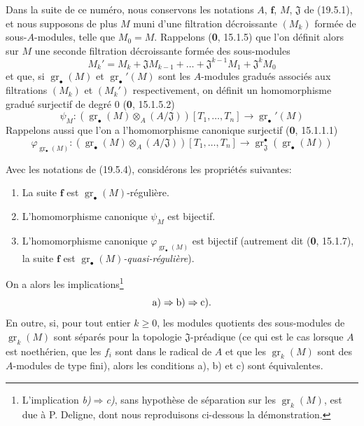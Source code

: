 \begin{env}[19.5.4]
\label{IV.19.5.4}
Dans la suite de ce numéro, nous conservons les notations $A$, $\mathbf f$, $M$, $\mathfrak J$ de (19.5.1), et nous supposons de plus $M$ muni d'une filtration décroissante $(M_k)$ formée de sous-$A$-modules, telle que $M_0=M$. Rappelons (\textbf{0}, 15.1.5) que l'on définit alors sur $M$ une seconde filtration décroissante formée des sous-modules
\[
  M_k'=M_k+\mathfrak JM_{k-1}+\ldots+\mathfrak J^{k-1}M_1+\mathfrak J^kM_0
\]
et que, si $\operatorname{gr}_\bullet(M)$ et $\operatorname{gr}_\bullet'(M)$ sont les $A$-modules gradués associés aux filtrations $(M_k)$ et $(M_k')$ respectivement, on définit un homomorphisme gradué surjectif de degré $0$ (\textbf{0}, 15.1.5.2)
\[
  \psi_M:(\operatorname{gr}_\bullet(M)\otimes_A(A/\mathfrak J))[T_1,\ldots,T_n]\longrightarrow\operatorname{gr}_\bullet'(M)
\]
Rappelons aussi que l'on a l'homomorphisme canonique surjectif (\textbf{0}, 15.1.1.1)
\[
  \varphi_{\operatorname{gr}_\bullet(M)}:(\operatorname{gr}_\bullet(M)\otimes_A(A/\mathfrak J))[T_1,\ldots,T_n]\longrightarrow\operatorname{gr}_{\mathfrak J}^\bullet(\operatorname{gr}_\bullet(M))
\]
\end{env}

\begin{theorem}[19.5.5]
\label{IV.19.5.5}
Avec les notations de \textup{(19.5.4)}, considérons les propriétés suivantes:
\begin{enumerate}
  \item[\textup{a)}] La suite $\mathbf f$ est $\operatorname{gr}_\bullet(M)$-régulière.
  \item[\textup{b)}] L'homomorphisme canonique $\psi_M$ est bijectif.
  \item[\textup{c)}] L'homomorphisme canonique $\varphi_{\operatorname{gr}_\bullet(M)}$ est bijectif \textup{(autrement dit (\textbf{0}, 15.1.7), la suite $\mathbf f$ est $\operatorname{gr}_\bullet(M)$\emph{-quasi-régulière})}.
\end{enumerate}


On a alors les implications\footnote{L'implication \emph{b)}$\Rightarrow$\emph{c)}, sans hypothèse de séparation sur les $\operatorname{gr}_k(M)$, est due à P. Deligne, dont nous reproduisons ci-dessous la démonstration.}
\[
  \textup{a)}\Rightarrow\textup{b)}\Rightarrow\textup{c)}.
\]
En outre, si, pour tout entier $k\geq0$, les modules quotients des sous-modules de $\operatorname{gr}_k(M)$ sont séparés pour la topologie $\mathfrak J$-préadique \textup{(ce qui est le cas lorsque $A$ est noethérien, que les $f_i$ sont dans le radical de $A$ et que les $\operatorname{gr}_k(M)$ sont des $A$-modules de type fini)}, alors les conditions \textup{a)}, \textup{b)} et \textup{c)} sont équivalentes.
\end{theorem}

